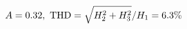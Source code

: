 \documentclass[preview]{standalone}
\begin{document}
\begin{align*}
\special{dvisvgm:raw <g id='unique000'>}A=0.32,\ \text{THD}=\sqrt{H_2^2+H_3^2}/H_1=6.3\%\special{dvisvgm:raw </g>}
\end{align*}
\end{document}
